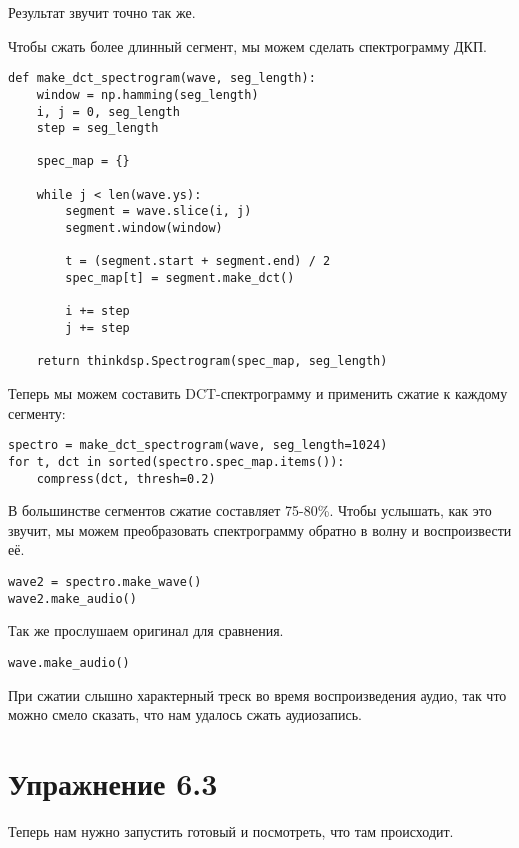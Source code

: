 \documentclass[a4paper,12pt]{report}
\begin{document}
Результат звучит точно так же.

Чтобы сжать более длинный сегмент, мы можем сделать спектрограмму ДКП. 

\begin{lstlisting}[caption=Функция \texttt{make\_dct\_spectrogram}]
def make_dct_spectrogram(wave, seg_length):
    window = np.hamming(seg_length)
    i, j = 0, seg_length
    step = seg_length

    spec_map = {}

    while j < len(wave.ys):
        segment = wave.slice(i, j)
        segment.window(window)

        t = (segment.start + segment.end) / 2
        spec_map[t] = segment.make_dct()

        i += step
        j += step

    return thinkdsp.Spectrogram(spec_map, seg_length)
\end{lstlisting}

Теперь мы можем составить DCT-спектрограмму и применить сжатие к каждому сегменту:

\begin{lstlisting}[caption=Сжатие звука]
spectro = make_dct_spectrogram(wave, seg_length=1024)
for t, dct in sorted(spectro.spec_map.items()):
    compress(dct, thresh=0.2)
\end{lstlisting}

В большинстве сегментов сжатие составляет 75-80\%. Чтобы услышать, как это звучит, мы можем преобразовать спектрограмму обратно в волну и воспроизвести её.

\begin{lstlisting}[caption=Воспроизведение сжатого звука]
wave2 = spectro.make_wave()
wave2.make_audio()
\end{lstlisting}

Так же прослушаем оригинал для сравнения.

\begin{lstlisting}[caption=Воспроизведение оригинального звука]
wave.make_audio()
\end{lstlisting}

При сжатии слышно характерный треск во время воспроизведения аудио, так что можно смело сказать, что нам удалось сжать аудиозапись.

\chapter{Упражнение 6.3}

 Теперь нам нужно запустить готовый  и посмотреть, что там происходит.
    
\end{document}
